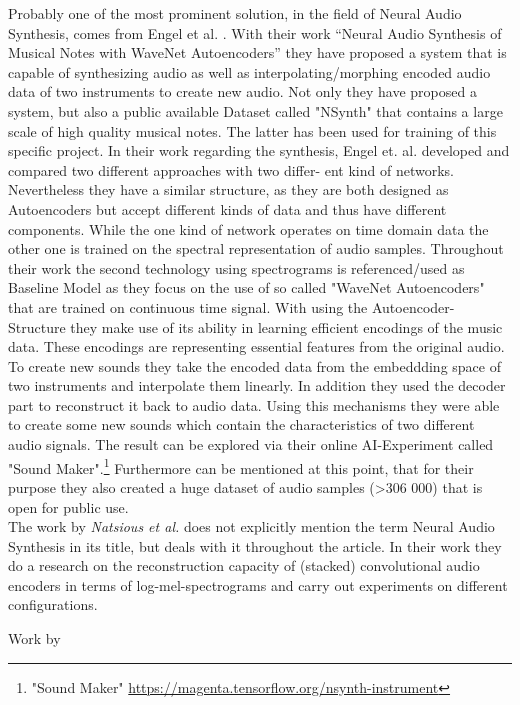 Probably one of the most prominent solution, in the field of Neural Audio Synthesis, comes from Engel et al. \cite{Engel2017}. With their work “Neural Audio Synthesis of Musical Notes with WaveNet Autoencoders” they have proposed a system that is capable of synthesizing audio as well as interpolating/morphing encoded audio data of two instruments to create new audio. Not only they have proposed a system, but also a public available Dataset called "NSynth" that contains a large scale of high quality musical notes. The latter has been used for training of this specific project. In their work regarding the synthesis, Engel et. al. developed and compared two different approaches with two differ- ent kind of networks. Nevertheless they have a similar structure, as they are both designed as Autoencoders but accept different kinds of data and thus have different components. While the one kind of network operates on time domain data the other one is trained on the spectral representation of audio samples. Throughout their work the second technology using spectrograms is referenced/used as Baseline Model as they focus on the use of so called "WaveNet Autoencoders" that are trained on continuous time signal. With using the Autoencoder-Structure they make use of its ability in learning efficient encodings of the music data. These encodings are representing essential features from the original audio. To create new sounds they take the encoded data from the embeddding space of two instruments and interpolate them linearly. In addition they used the decoder part to reconstruct it back to audio data. Using this mechanisms they were able to create some new sounds which contain the characteristics of two different audio signals. The result can be explored via their online AI-Experiment called "Sound Maker".\footnote{"Sound Maker" \url{https://magenta.tensorflow.org/nsynth-instrument}} Furthermore can be mentioned at this point, that for their purpose they also created a huge dataset of audio samples (>306 000) that is open for public use.\\

The work by \textit{Natsious et al.} does not explicitly mention the term Neural Audio Synthesis in its title, but deals with it throughout the article. \cite{Natsiou2023} In their work they do a research on the reconstruction capacity of (stacked) convolutional audio encoders in terms of log-mel-spectrograms and carry out experiments on different configurations.

Work by \cite{colonel2017improving, colonel2018autoencoding, Colonel2020, roche2019autoencoders, hantrakul2019fast}

